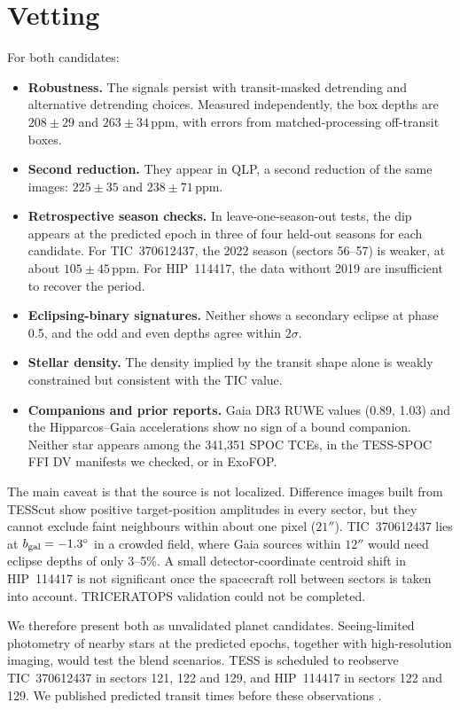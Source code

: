 \documentclass{aastex701}
\begin{document}
\section{Vetting}
For both candidates:
\begin{itemize}
\item \textbf{Robustness.} The signals persist with transit-masked detrending and alternative detrending choices. Measured independently, the box depths are $208\pm29$ and $263\pm34$\,ppm, with errors from matched-processing off-transit boxes.
\item \textbf{Second reduction.} They appear in QLP, a second reduction of the same images: $225\pm35$ and $238\pm71$\,ppm.
\item \textbf{Retrospective season checks.} In leave-one-season-out tests, the dip appears at the predicted epoch in three of four held-out seasons for each candidate. For TIC~370612437, the 2022 season (sectors 56--57) is weaker, at about $105\pm45$\,ppm. For HIP~114417, the data without 2019 are insufficient to recover the period.
\item \textbf{Eclipsing-binary signatures.} Neither shows a secondary eclipse at phase 0.5, and the odd and even depths agree within $2\sigma$.
\item \textbf{Stellar density.} The density implied by the transit shape alone is weakly constrained but consistent with the TIC value.
\item \textbf{Companions and prior reports.} Gaia DR3 \citep{GaiaDR3} RUWE values (0.89, 1.03) and the Hipparcos--Gaia accelerations \citep{Brandt2021} show no sign of a bound companion. Neither star appears among the 341,351 SPOC TCEs, in the TESS-SPOC FFI DV manifests we checked, or in ExoFOP.
\end{itemize}

The main caveat is that the source is not localized. Difference images built from TESScut \citep{Brasseur2019} show positive target-position amplitudes in every sector, but they cannot exclude faint neighbours within about one pixel ($21''$). TIC~370612437 lies at $b_{\rm gal}=-1.3^\circ$ in a crowded field, where Gaia sources within $12''$ would need eclipse depths of only 3--5\%. A small detector-coordinate centroid shift in HIP~114417 is not significant once the spacecraft roll between sectors is taken into account. TRICERATOPS validation \citep{Giacalone2021} could not be completed.

We therefore present both as unvalidated planet candidates. Seeing-limited photometry of nearby stars at the predicted epochs, together with high-resolution imaging, would test the blend scenarios. TESS is scheduled to reobserve TIC~370612437 in sectors 121, 122 and 129, and HIP~114417 in sectors 122 and 129. We published predicted transit times before these observations \citep{ChopraZenodo}.
\end{document}
